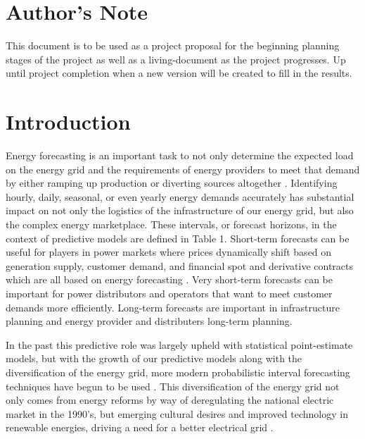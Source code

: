 \documentclass[sigconf]{acmart}
\begin{document}
\maketitle

\section{Author's Note}
This document is to be used as a project proposal for the beginning planning stages of the project as well as a living-document as the project progresses. Up until project completion when a new version will be created to fill in the results.

\section{Introduction}
Energy forecasting is an important task to not only determine the expected load on the energy grid and the requirements of energy providers to meet that demand by either ramping up production or diverting sources altogether \cite{Hong16}. Identifying hourly, daily, seasonal, or even yearly energy demands accurately has substantial impact on not only the logistics of the infrastructure of our energy grid, but also the complex energy marketplace. These intervals, or forecast horizons, in the context of predictive models are defined in Table 1. Short-term forecasts can be useful for players in power markets where prices dynamically shift based on generation supply, customer demand, and financial spot and derivative contracts which are all based on energy forecasting \cite{Bunn04}. Very short-term forecasts can be important for power distributors and operators that want to meet customer demands more efficiently. Long-term forecasts are important in infrastructure planning and energy provider and distributers long-term planning. 

In the past this predictive role was largely upheld with statistical point-estimate models, but with the growth of our predictive models along with the diversification of the energy grid, more modern probabilistic interval forecasting techniques have begun to be used \cite{Lee21, Weron14, Hong16}. This diversification of the energy grid not only comes from energy reforms by way of deregulating the national electric market in the 1990's, but emerging cultural desires and improved technology in renewable energies, driving a need for a better electrical grid \cite{Joskow01}.
\end{document}
